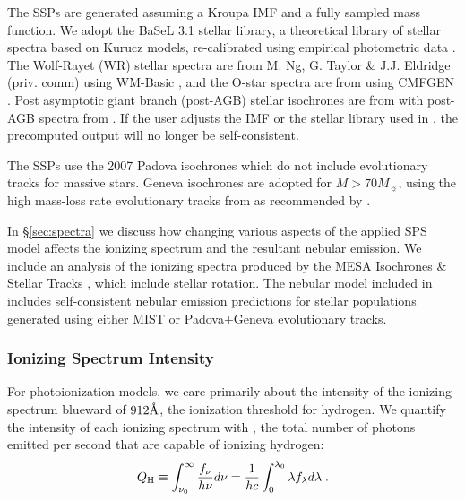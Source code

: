 The SSPs are generated assuming a Kroupa IMF \citep{Kroupa01} and a fully sampled mass function. We adopt the BaSeL 3.1 stellar library, a theoretical library of stellar spectra based on Kurucz models, re-calibrated using empirical photometric data \citep{BaSeL}. The Wolf-Rayet (WR) stellar spectra are from M. Ng, G. Taylor \& J.J. Eldridge (priv. comm) using WM-Basic \citep{Pauldrach01}, and the O-star spectra are from \citet{Smith02} using CMFGEN \citep{HillierMiller}. Post asymptotic giant branch (post-AGB) stellar isochrones are from \citet{Vassiliadis} with post-AGB spectra from \citet{Rauch03}. If the user adjusts the IMF or the stellar library used in \FSPS, the precomputed \Cloudy output will no longer be self-consistent.

The SSPs use the 2007 Padova isochrones \citep{Bertelli94, Girardi00, Marigo08} which do not include evolutionary tracks for massive stars. Geneva isochrones are adopted for $M > 70 M_{\sun}$, using the high mass-loss rate evolutionary tracks from \citep{Schaller92, Meynet00} as recommended by \citet{Levesque10}. 

In \S\ref{sec:spectra} we discuss how changing various aspects of the applied SPS model affects the ionizing spectrum and the resultant nebular emission. We include an analysis of the ionizing spectra produced by the MESA Isochrones \& Stellar Tracks \citep[MIST,][]{Dotter16, Choi16}, which include stellar rotation. The nebular model included in \FSPS includes self-consistent nebular emission predictions for stellar populations generated using either MIST or Padova+Geneva evolutionary tracks.

\subsubsection{Ionizing Spectrum Intensity}\label{sec:methods:cloudy:intensity}

For photoionization models, we care primarily about the intensity of the ionizing spectrum blueward of $912 \mbox{\AA}$, the ionization threshold for hydrogen. We quantify the intensity of each ionizing spectrum with \QH{}, the total number of photons emitted per second that are capable of ionizing hydrogen:
\begin{equation}\label{eq:Q}
    Q_{\mathrm{H}}{} \equiv \int_{\nu_0}^{\infty}\frac{f_{\nu}}{h \nu} d\nu = \frac{1}{hc} \int_0^{\lambda_0}\lambda f_{\lambda}d\lambda\;.
\end{equation}

